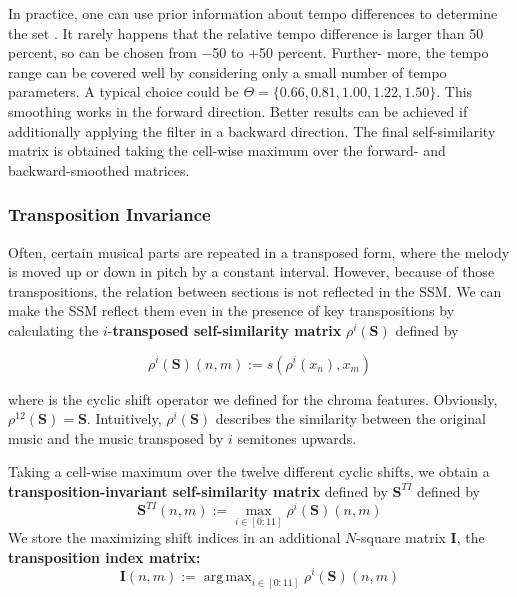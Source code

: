 \documentclass[a4paper, 9pt, twocolumn]{extarticle}
\DeclareMathOperator*{\argmax}{arg\,max}
\begin{document}
In practice, one can use prior information about tempo differences to determine the set \Theta. It rarely happens that the relative tempo difference is larger than 50 percent, so \Theta can be chosen from −50 to +50 percent. Further-
more, the tempo range can be covered well by considering only a small number of tempo parameters. A typical choice could be  $\Theta=\{0.66, 0.81, 1.00, 1.22, 1.50\}$.
This smoothing works in the forward direction. Better results can be achieved if additionally applying the filter in a backward direction. The final self-similarity matrix is obtained taking the cell-wise maximum over the forward- and backward-smoothed matrices. 


\subsubsection{Transposition Invariance}
\label{subsubsection:ssmEnhancementTransInvariance}

Often, certain musical parts are repeated in a transposed form, where the melody is moved up or down in pitch by a constant interval. However, because of those transpositions, the relation between sections is not reflected in the SSM. We can make the SSM reflect them even in the presence of key transpositions by calculating the $i$-\textbf{transposed self-similarity matrix} $\rho^i(\textbf{S})$ defined by

\[\rho^i(\textbf{S})(n,m):=s(\rho^{i}(x_{n}), x_{m})\]

where \rho  is the cyclic shift operator we defined for the chroma features. Obviously, $\rho^{12}(\textbf{S})=\textbf{S}$. Intuitively, $\rho^i(\textbf{S})$ describes the similarity between the original music  and the music transposed by $i$ semitones upwards.

Taking a cell-wise maximum over the twelve different cyclic shifts, we obtain a \textbf{transposition-invariant self-similarity matrix}  defined by $\textbf{S}^{TI}$ defined by
\[\textbf{S}^{TI}(n,m):=\max_{i\in[0:11]}\rho^i(\textbf{S})(n,m)\]
We store the maximizing shift indices in an additional $N$-square matrix $\textbf{I}$, the \textbf{transposition index matrix:}
\[\textbf{I}(n,m):=\argmax_{i\in[0:11]}\rho^i(\textbf{S})(n,m)\]
\end{document}
